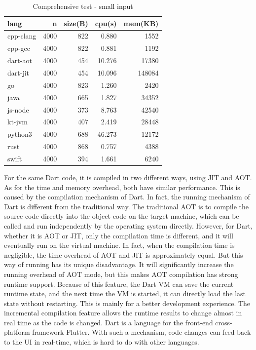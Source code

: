\begin{table}[htbp]
    \caption{Comprehensive test - small input}
    \label{tab:mandelbrot-2}
    \begin{center}
        \begin{tabular}{lrrrr}
            \toprule
            lang      & n    & size(B) & cpu(s) & mem(KB) \\
            \midrule
            cpp-clang & 4000 & 822     & 0.880  & 1552    \\
            cpp-gcc   & 4000 & 822     & 0.881  & 1192    \\
            dart-aot  & 4000 & 454     & 10.276 & 17380   \\
            dart-jit  & 4000 & 454     & 10.096 & 148084  \\
            go        & 4000 & 823     & 1.260  & 2420    \\
            java      & 4000 & 665     & 1.827  & 34352   \\
            js-node   & 4000 & 373     & 8.763  & 42540   \\
            kt-jvm    & 4000 & 407     & 2.419  & 28448   \\
            python3   & 4000 & 688     & 46.273 & 12172   \\
            rust      & 4000 & 868     & 0.757  & 4388    \\
            swift     & 4000 & 394     & 1.661  & 6240    \\
            \bottomrule
        \end{tabular}
    \end{center}
\end{table}

For the same Dart code, it is compiled in two different ways, using JIT and AOT. As for the time and memory overhead, both have similar performance. This is caused by the compilation mechanism of Dart. In fact, the running mechanism of Dart is different from the traditional way. The traditional AOT is to compile the source code directly into the object code on the target machine, which can be called and run independently by the operating system directly. However, for Dart, whether it is AOT or JIT, only the compilation time is different, and it will eventually run on the virtual machine. In fact, when the compilation time is negligible, the time overhead of AOT and JIT is approximately equal. But this way of running has its unique disadvantage. It will significantly increase the running overhead of AOT mode, but this makes AOT compilation has strong runtime support. Because of this feature, the Dart VM can save the current runtime state, and the next time the VM is started, it can directly load the last state without restarting. This is mainly for a better development experience. The incremental compilation feature allows the runtime results to change almost in real time as the code is changed. Dart is a language for the front-end cross-platform framework Flutter. With such a mechanism, code changes can feed back to the UI in real-time, which is hard to do with other languages.

